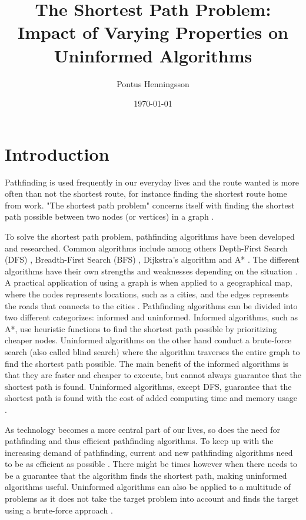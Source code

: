 \documentclass{csfourzero}
\title{The Shortest Path Problem: 
Impact of Varying Properties on Uninformed Algorithms}
\author{Pontus Henningsson}
\date{\today}
\begin{document}
\maketitle


\section{Introduction}
\label{sec:intro}
Pathfinding is used frequently in our everyday lives and the route wanted is more often than not the shortest route, for instance finding the shortest route home from work. "The shortest path problem" concerns itself with finding the shortest path possible between two nodes (or vertices) in a graph \cite{rachmawati2020analysis}. 


To solve the shortest path problem, pathfinding algorithms have been developed and researched. Common algorithms include among others Depth-First Search (DFS) \cite{reif1985depth}, Breadth-First Search (BFS) \cite{5219222}, Dijkstra's algorithm \cite{dijkstra1959} and A* \cite{4082128}. The different algorithms have their own strengths and weaknesses depending on the situation \cite{ashish2021path}. A practical application of using a graph is when applied to a geographical map, where the nodes represents locations, such as a cities, and the edges represents the roads that connects to the cities \cite{monzonis2019pathfinding}. Pathfinding algorithms can be divided into two different categorizes: informed and uninformed. Informed algorithms, such as A*, use heuristic functions to find the shortest path possible by prioritizing cheaper nodes. Uninformed algorithms on the other hand conduct a brute-force search (also called blind search) where the algorithm traverses the entire graph to find the shortest path possible. The main benefit of the informed algorithms is that they are faster and cheaper to execute, but cannot always guarantee that the shortest path is found. Uninformed algorithms, except DFS, guarantee that the shortest path is found with the cost of added computing time and memory usage \cite{ashish2021path}.


As technology becomes a more central part of our lives, so does the need for pathfinding and thus efficient pathfinding algorithms. To keep up with the increasing demand of pathfinding, current and new pathfinding algorithms need to be as efficient as possible \cite{foead2021systematic}. There might be times however when there needs to be a guarantee that the algorithm finds the shortest path, making uninformed algorithms useful. Uninformed algorithms can also be applied to a multitude of problems as it does not take the target problem into account and finds the target using a brute-force approach \cite{ashish2021path}.
\end{document}
